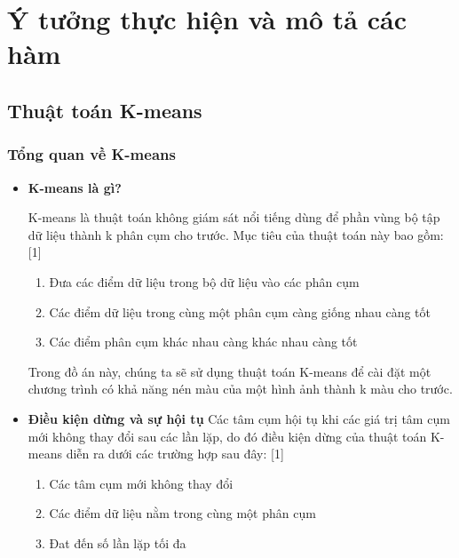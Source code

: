\section{Ý tưởng thực hiện và mô tả các hàm}
\subsection{Thuật toán K-means}
\subsubsection{Tổng quan về K-means}
\begin{itemize}
	\item \textbf{K-means là gì?} \par
	K-means là thuật toán không giám sát nổi tiếng dùng để phần vùng bộ tập dữ liệu thành k phân cụm cho trước. Mục tiêu của thuật toán này bao gồm: [1]
	\begin{enumerate}
		\item Đưa các điểm dữ liệu trong bộ dữ liệu vào các phân cụm
		\item Các điểm dữ liệu trong cùng một phân cụm càng giống nhau càng tốt
		\item Các điểm phân cụm khác nhau càng khác nhau càng tốt
	\end{enumerate}
	Trong đồ án này, chúng ta sẽ sử dụng thuật toán K-means để cài đặt một chương trình có khả năng nén màu của một hình ảnh thành k màu cho trước.
	\item \textbf{Điều kiện dừng và sự hội tụ}
	Các tâm cụm hội tụ khi các giá trị tâm cụm mới không thay đổi sau các lần lặp, do đó điều kiện dừng của thuật toán K-means diễn ra dưới các trường hợp sau đây: [1]
	\begin{enumerate}
		\item Các tâm cụm mới không thay đổi
		\item Các điểm dữ liệu nằm trong cùng một phân cụm
		\item Đat đến số lần lặp tối đa
	\end{enumerate}
\end{itemize}
